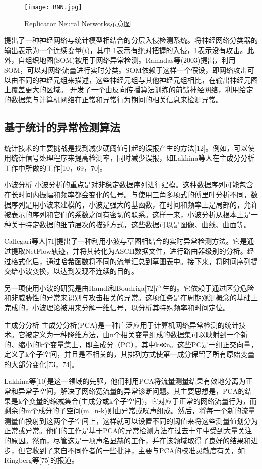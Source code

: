 \begin{figure}
    \centering
    \texttt{[image: RNN.jpg]}
    \caption{Replicator Neural Networks示意图}
    \label{fig:rnn}
  \end{figure}


\citet{2001HIDE} 提出了一种神经网络与统计模型相结合的分层入侵检测系统。将神经网络分类器的输出表示为一个连续变量($t$)，其中-1表示有绝对把握的入侵，1表示没有攻击。此外，自组织地图(SOM)被用于网络异常检测。Ramadas等(2003)提出，利用SOM，可以对网络流量进行实时分类。SOM依赖于这样一个假设，即网络攻击可以由不同的神经元组来描述，这些神经元组与其他神经元组相比，在输出神经元图上覆盖更大的区域。\citet{5592568} 开发了一个由反向传播算法训练的前馈神经网络，利用给定的数据集与计算机网络在正常和异常行为期间的相关信息来检测异常。

\subsection{基于统计的异常检测算法}

统计技术的主要挑战是找到减少硬阈值引起的误报产生的方法[12]。例如，可以使用统计信号处理程序来提高检测率，同时减少误报，如Lakhina等人在主成分分析工作中所做的工作[10，69，70]。

小波分析
小波分析的重点是对非稳定数据序列进行建模。这种数据序列可能包含在长时间内振幅和频率都会变化的信号。与使用三角多项式的傅里叶分析不同，数据序列是用小波来建模的，小波是强大的基函数，在时间和频率上是局部的，允许被表示的序列和它们的系数之间有密切的联系。这样一来，小波分析从根本上是一种关于特定数据的细节层次的描述方式，这些数据可以是图像、曲线、曲面等。

Callegari等人[71]提出了一种利用小波与草图相结合的实时异常检测方法。它是通过提取NetFlow轨迹，并将其转化为ASCII数据文件，进行路由器级别的分析。经过格式化后，通过哈希函数将不同的流量汇总到草图表中。接下来，将时间序列提交给小波变换，以达到发现不连续的目的。

另一项使用小波的研究是由Hamdi和Boudriga[72]产生的。它依赖于通过区分危险和非威胁性的异常来识别与攻击相关的异常。这项任务是在周期观测概念的基础上完成的，小波理论被用来分解一维信号，以分析其特殊频率和时间定位。

主成分分析
主成分分析(PCA)是一种广泛应用于计算机网络异常检测的统计技术。它被定义为一种降维方法，由n个相关变量组成的数据集可以映射到一个新的、缩小的k个变量集上，即主成分（PC），其中k≪n。这些PC是一组正交向量，定义了k个子空间，并且是不相关的，其排列方式使第一成分保留了所有原始变量的大部分变化[73，74]。

Lakhina等[10]是这一领域的先驱，他们利用PCA将流量测量结果有效地分离为正常和异常子空间，解决了网络宽流量的异常诊断问题。其主要思想是，PCA的结果是k个变量的缩减集合(主成分或k个子空间)，它对应于正常的网络流量行为，而剩余的m个成分的子空间(m=n-k)则由异常或噪声组成。然后，将每一个新的流量测量值投射到这两个子空间上，这样就可以设置不同的阈值来将这些测量值划分为正常或异常。他们的工作是基于PCA的异常检测方法在过去十年中受到大量关注的原因。然而，尽管这是一项声名显赫的工作，并在该领域取得了良好的结果和进步，但它收到了来自不同作者的一些批评，主要与PCA的校准灵敏度有关，如Ringberg等[75]的报道。

